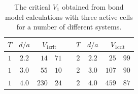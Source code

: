 \begin{table}
  \center
  \begin{tabular}{c c r @{.} l p{0cm} c c r @{.} l}
    $T$ & $d/a$ & \multicolumn{2}{c}{$V_{1\textrm{crit}}$} & &
    $T$ & $d/a$ & \multicolumn{2}{c}{$V_{1\textrm{crit}}$} \\
    \hline 
    $1$ & $2.2$ & $ 14$&$71$ & &
    $2$ & $2.2$ & $ 25$&$99$ \\
    $1$ & $3.0$ & $ 55$&$10$ & &
    $2$ & $3.0$ & $107$&$90$ \\
    $1$ & $4.0$ & $230$&$24$ & &
    $2$ & $4.0$ & $459$&$87$ \\
  \end{tabular}
  \caption[Critical $V_1$ for different systems]{
  The critical $V_1$ obtained from bond model calculations with three active
  cells for a number of different systems.
  }
  \label{tab:critical_V1}
\end{table}

